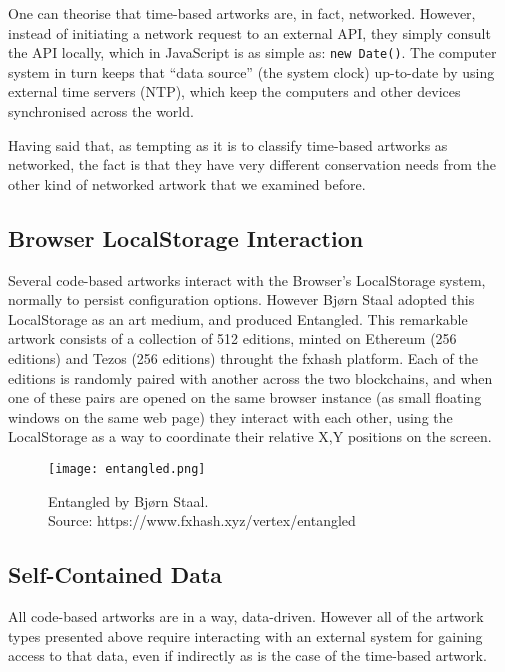 One can theorise that time-based artworks are, in fact, networked. However, instead of initiating a network request to an external API, they simply consult the API locally, which in JavaScript is as simple as: \texttt{new Date()}. The computer system in turn keeps that ``data source'' (the system clock) up-to-date by using external time servers (NTP), which keep the computers and other devices synchronised across the world.

Having said that, as tempting as it is to classify time-based artworks as networked, the fact is that they have very different conservation needs from the other kind of networked artwork that we examined before.


\subsection{Browser LocalStorage Interaction}

Several code-based artworks interact with the Browser's LocalStorage system, normally to persist configuration options. However Bjørn Staal adopted this LocalStorage as an art medium, and produced Entangled. This remarkable artwork consists of a collection of 512 editions, minted on Ethereum (256 editions) and Tezos (256 editions) throught the fxhash platform. Each of the editions is randomly paired with another across the two blockchains, and when one of these pairs are opened on the same browser instance (as small floating windows on the same web page) they interact with each other, using the LocalStorage as a way to coordinate their relative X,Y positions on the screen.

\begin{figure}[h]
    \centering
    \captionsetup{justification=centering}
    \texttt{[image: entangled.png]}
    \captionsetup{justification=centering}
    \caption[Entangled by Bjørn Staal]{Entangled by Bjørn Staal. \\ Source: https://www.fxhash.xyz/vertex/entangled}
    \label{fig:detachment}
\end{figure}


\subsection{Self-Contained Data}

All code-based artworks are in a way, data-driven. However all of the artwork types presented above require interacting with an external system for gaining access to that data, even if indirectly as is the case of the time-based artwork.


